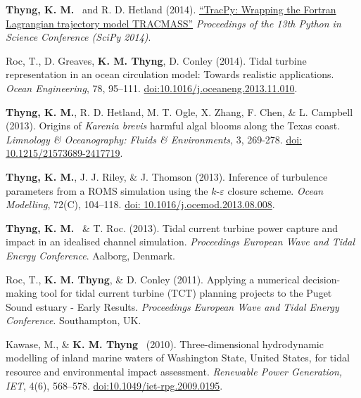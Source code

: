 \documentclass[10pt,letterpaper]{article}
\newcommand{\kmt}{\textbf{K. M. Thyng}}
\newcommand{\tkm}{\textbf{Thyng, K. M.}}
\renewenvironment{itemize}{
  \begin{list}{}{
    \setlength{\leftmargin}{1.5em}
    \setlength{\itemsep}{0.25em}
    \setlength{\parskip}{0pt}
    \setlength{\parsep}{0.25em}
  }
}{
  \end{list}
}
\begin{document}
\begin{itemize}
\item \tkm~ and R. D. Hetland (2014). \href{http://conference.scipy.org/proceedings/scipy2014/pdfs/thyng.pdf}{``TracPy: Wrapping the Fortran Lagrangian trajectory model TRACMASS''} \textit{Proceedings of the 13th Python in Science Conference (SciPy 2014)}.

\item Roc, T., D. Greaves, \kmt, D. Conley (2014). Tidal turbine representation in an ocean circulation model: Towards realistic applications. \textit{Ocean Engineering}, 78, 95--111. \href{http://dx.doi.org/10.1016/j.oceaneng.2013.11.010}{doi:10.1016/j.oceaneng.2013.11.010}.

\item \tkm, R. D. Hetland, M. T. Ogle, X. Zhang, F. Chen, \& L. Campbell (2013). Origins of \textit{Karenia brevis} harmful algal blooms along the Texas coast. \textit{Limnology \& Oceanography: Fluids \& Environments}, 3, 269-278. \href{http://lofe.dukejournals.org/content/3/269.full}{doi: 10.1215/21573689-2417719}.

\item \tkm, J. J. Riley, \& J. Thomson (2013). Inference of turbulence parameters from a ROMS simulation using the $k$-$\varepsilon$ closure scheme. \textit{Ocean Modelling}, 72(C), 104--118. \href{http://www.sciencedirect.com/science/article/pii/S1463500313001613}{doi: 10.1016/j.ocemod.2013.08.008}.

\item \tkm~ \& T. Roc. (2013). Tidal current turbine power capture and impact in an idealised channel simulation. \textit{Proceedings European Wave and Tidal Energy Conference}. Aalborg, Denmark.

\item Roc, T., \kmt, \& D. Conley (2011). Applying a numerical decision-making tool for tidal current turbine (TCT) planning projects to the Puget Sound estuary - Early Results. \textit{Proceedings European Wave and Tidal Energy Conference}. Southampton, UK.

\item Kawase, M., \& \kmt~ (2010). Three-dimensional hydrodynamic modelling of inland marine waters of Washington State, United States, for tidal resource and environmental impact assessment. \textit{Renewable Power Generation, IET}, 4(6), 568--578. \href{http://digital-library.theiet.org/content/journals/10.1049/iet-rpg.2009.0195}{doi:10.1049/iet-rpg.2009.0195}.

\end{itemize}
\end{document}

